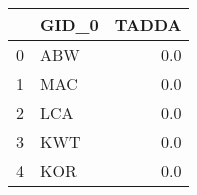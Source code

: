 \begin{tabular}{llr}
\toprule
{} & GID\_0 &  TADDA \\
\midrule
0 &   ABW &    0.0 \\
1 &   MAC &    0.0 \\
2 &   LCA &    0.0 \\
3 &   KWT &    0.0 \\
4 &   KOR &    0.0 \\
\bottomrule
\end{tabular}
